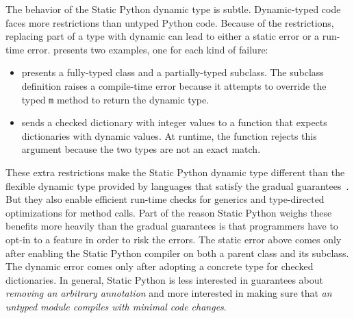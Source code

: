 \documentclass[english,cleveref,crc]{programming}
\newcommand{\SP}{Static Python}
\newcommand{\code}[1]{\texttt{#1}}
\begin{document}
The behavior of the \SP{} dynamic type is subtle.
Dynamic-typed code faces more restrictions than untyped Python code.
Because of the restrictions, replacing part of a type with dynamic can lead to
either a static error or a run-time error.
 presents two examples, one for each kind of failure:
\begin{itemize}
  \item
     presents a fully-typed class and a partially-typed subclass.
    The subclass definition raises a compile-time error because it attempts to override
    the typed \code{m} method to return the dynamic type.

  \item
     sends a checked dictionary with integer values to a
    function that expects dictionaries with dynamic values.
    At runtime, the function rejects this argument because the two types are
    not an exact match.
\end{itemize}
These extra restrictions make the \SP{} dynamic type different than the flexible
dynamic type provided by languages that satisfy the gradual guarantees~\cite{svcb-snapl-2015}.
But they also enable efficient run-time checks for generics and type-directed optimizations
for method calls.
Part of the reason \SP{} weighs these benefits more heavily than the gradual guarantees
is that programmers have to opt-in to a feature in order to risk the errors.
The static error above comes only after enabling the \SP{} compiler on both a parent
class and its subclass.
The dynamic error comes only after adopting a concrete type for checked dictionaries.
In general, \SP{} is less interested in guarantees about \emph{removing
an arbitrary annotation} and more interested in making sure that \emph{an
untyped module compiles with minimal code changes}.
\end{document}
